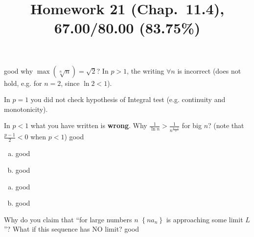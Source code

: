 \documentclass[10pt]{article} %
\title{Homework 21 (Chap.~11.4),
67.00/80.00 (83.75\%)
}
\begin{document}
\maketitle
{}
good
why $\max\left( \sqrt[n]{n} \right)=\sqrt{2}$?
In $p>1$, the writing $\forall n$ is incorrect (does not hold, e.g. for $n=2$, since $\ln2 < 1$).

In $p=1$ you did not check hypothesis of Integral test (e.g. continuity and monotonicity).

In $p<1$ what you have written is \textbf{wrong}. Why $\frac{1}{\ln n}>\frac{1}{n^{\frac{p-1}{2}}}$ for big $n$? (note that $\frac{p-1}{2}<0$ 
when $p<1$)
good
\begin{enumerate}[(a)]
	\item good
	\item good
\end{enumerate}
\begin{enumerate}[(a)]
	\item good
	\item good
\end{enumerate}
Why do you claim that ``for large numbers $n$ $\left\{na_n\right\}$ is approaching some limit $L$''? What if this sequence has
NO limit?
good
\end{document}
